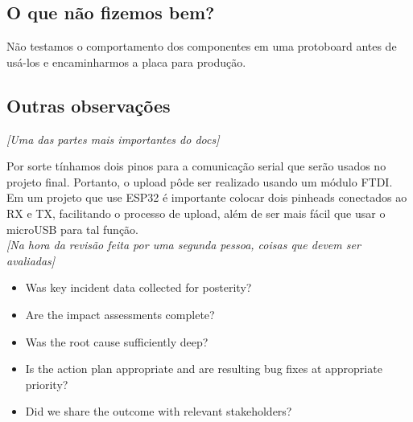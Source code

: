 \documentclass[a4paper, 12pt]{article}
\begin{document}
	\subsection{O que não fizemos bem?}	
	Não testamos o comportamento dos componentes em uma protoboard antes de usá-los e encaminharmos a placa para produção.
	\subsection{Outras observações}
	\textit{[Uma das partes mais importantes do docs]}
	
	Por sorte tínhamos dois pinos para a comunicação serial que serão usados no projeto final. Portanto, o upload pôde ser realizado usando um módulo FTDI. Em um projeto que use ESP32 é importante colocar dois pinheads conectados ao RX e TX, facilitando o processo de upload, além de ser mais fácil que usar o microUSB para tal função.\\
	
	
	\textit{[Na hora da revisão feita por uma segunda pessoa, coisas que devem ser avaliadas]}
	\begin{itemize}	
		\item Was key incident data collected for posterity?
		\item Are the impact assessments complete?
		\item Was the root cause sufficiently deep?
		\item Is the action plan appropriate and are resulting bug fixes at appropriate priority?
		\item Did we share the outcome with relevant stakeholders?
	\end{itemize}
	
\end{document}
